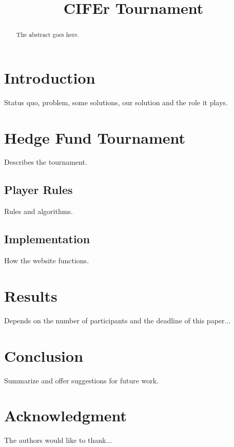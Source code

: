 \documentclass[conference, draftcls]{IEEEtran}
\begin{document}
\title{CIFEr Tournament}

\author{
  \and
}


\maketitle

\begin{abstract}
The abstract goes here.
\end{abstract}

\IEEEpeerreviewmaketitle

\section{Introduction}
Status quo, problem, some solutions, our solution and the role it plays.

\section{Hedge Fund Tournament}
Describes the tournament.

\subsection{Player Rules}
Rules and algorithms.

\subsection{Implementation}
How the website functions.

\section{Results}
Depends on the number of participants and the deadline of this paper...

\section{Conclusion}
Summarize and offer suggestions for future work.

\section*{Acknowledgment}
The authors would like to thank...



\end{document}

